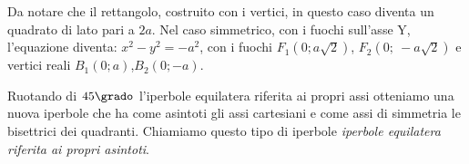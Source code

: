 Da notare che il rettangolo, costruito con i vertici, in questo caso diventa un 
quadrato di lato pari a \(2a\).
Nel caso simmetrico, con i fuochi sull'asse Y, l'equazione diventa:
\( x^{2} - y^{2} =- a^{2} \), con i fuochi 
\( F_{1} \left(0; a \sqrt{2}\right)\), \( F_{2} \left(0;~-a \sqrt{2}\right)\) 
e vertici reali \( B_{1} (0; a)\),\( B_{2} (0; -a)\).


Ruotando di \(45\grado\) l'iperbole equilatera riferita ai propri 
assi otteniamo una nuova iperbole che ha come asintoti gli assi cartesiani 
e come assi di simmetria le bisettrici dei quadranti.
Chiamiamo questo tipo 
di iperbole \emph{iperbole equilatera riferita ai propri asintoti}.



